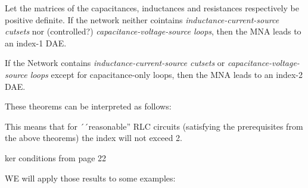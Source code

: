 \begin{theorem} \cite{Tischendorf2004Topological}
	Let the matrices of the capacitances, inductances and resistances respectively be positive definite. If the network neither cointains \emph{inductance-current-source cutsets} nor (controlled?) \emph{capacitance-voltage-source loops}, then the MNA leads to an index-1 DAE.
\end{theorem}

\begin{theorem} \cite{Tischendorf2004Topological}
	If the Network contains \emph{inductance-current-source cutsets} or \emph{capacitance-voltage-source loops} except for capacitance-only loops, then the MNA leads to an index-2 DAE.
\end{theorem}

These theorems can be interpreted as follows:


This means that for ´´reasonable'' RLC circuits (satisfying the prerequisites from the above theorems) the index will not exceed 2.


ker conditions from page 22

WE will apply those results to some examples: